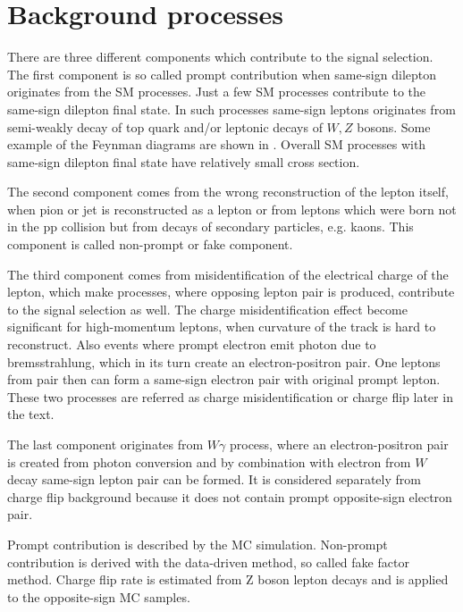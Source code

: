 \section{Background processes}
\label{sec:wprimeBackgrounds}


There are three different components which contribute to the signal selection.
The first component is so called prompt contribution when same-sign dilepton originates from the SM processes.
Just a few SM processes contribute to the same-sign dilepton final state. In such processes same-sign leptons originates from semi-weakly decay of top quark
and/or leptonic decays of $W, Z$ bosons. Some example of the Feynman diagrams are shown in .
Overall SM processes with same-sign dilepton final state have relatively small cross section.

The second component comes from the wrong reconstruction of the lepton itself, when pion or jet is reconstructed as a lepton or from leptons which were born 
not in the pp collision but from decays of secondary particles, e.g. kaons. This component is called non-prompt or fake component.

The third component comes from misidentification of the electrical charge of the lepton, which make processes, where opposing lepton pair is produced, 
contribute to the signal selection as well. The charge misidentification effect become significant for high-momentum leptons, when curvature of the track 
is hard to reconstruct. Also events where prompt electron emit photon due to bremsstrahlung, which in its turn create an electron-positron pair.
One leptons from pair then can form a same-sign electron pair with original prompt lepton. These two processes are referred as charge misidentification or
charge flip later in the text.

The last component originates from $W\gamma$ process, where an electron-positron pair is created from photon conversion and by combination with electron from $W$ decay
same-sign lepton pair can be formed. It is considered separately from charge flip background because it does not contain prompt opposite-sign electron pair.

Prompt contribution is described by the MC simulation. 
Non-prompt contribution is derived with the data-driven method, so called fake factor method.
Charge flip rate is estimated from Z boson lepton decays and is applied to the opposite-sign MC samples.


